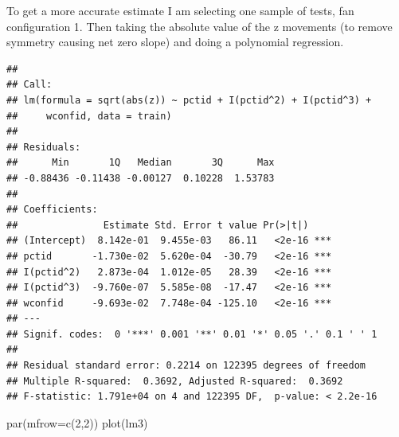\documentclass[
]{article}
\newenvironment{Shaded}{\begin{snugshade}}{\end{snugshade}}
\newcommand{\AttributeTok}[1]{\textcolor[rgb]{0.77,0.63,0.00}{#1}}
\newcommand{\DecValTok}[1]{\textcolor[rgb]{0.00,0.00,0.81}{#1}}
\newcommand{\FunctionTok}[1]{\textcolor[rgb]{0.00,0.00,0.00}{#1}}
\newcommand{\NormalTok}[1]{#1}
\newcommand{\OtherTok}[1]{\textcolor[rgb]{0.56,0.35,0.01}{#1}}
\newcommand{\SpecialCharTok}[1]{\textcolor[rgb]{0.00,0.00,0.00}{#1}}
\begin{document}
To get a more accurate estimate I am selecting one sample of tests, fan
configuration 1. Then taking the absolute value of the z movements (to
remove symmetry causing net zero slope) and doing a polynomial
regression.

\begin{Shaded}
\end{Shaded}

\begin{verbatim}
## 
## Call:
## lm(formula = sqrt(abs(z)) ~ pctid + I(pctid^2) + I(pctid^3) + 
##     wconfid, data = train)
## 
## Residuals:
##      Min       1Q   Median       3Q      Max 
## -0.88436 -0.11438 -0.00127  0.10228  1.53783 
## 
## Coefficients:
##               Estimate Std. Error t value Pr(>|t|)    
## (Intercept)  8.142e-01  9.455e-03   86.11   <2e-16 ***
## pctid       -1.730e-02  5.620e-04  -30.79   <2e-16 ***
## I(pctid^2)   2.873e-04  1.012e-05   28.39   <2e-16 ***
## I(pctid^3)  -9.760e-07  5.585e-08  -17.47   <2e-16 ***
## wconfid     -9.693e-02  7.748e-04 -125.10   <2e-16 ***
## ---
## Signif. codes:  0 '***' 0.001 '**' 0.01 '*' 0.05 '.' 0.1 ' ' 1
## 
## Residual standard error: 0.2214 on 122395 degrees of freedom
## Multiple R-squared:  0.3692, Adjusted R-squared:  0.3692 
## F-statistic: 1.791e+04 on 4 and 122395 DF,  p-value: < 2.2e-16
\end{verbatim}

\begin{Shaded}
\begin{Highlighting}[]
\FunctionTok{par}\NormalTok{(}\AttributeTok{mfrow=}\FunctionTok{c}\NormalTok{(}\DecValTok{2}\NormalTok{,}\DecValTok{2}\NormalTok{))}
\FunctionTok{plot}\NormalTok{(lm3)}
\end{Highlighting}
\end{Shaded}
\end{document}
